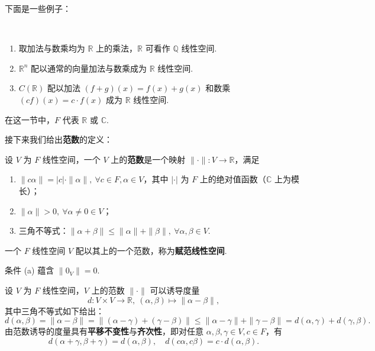 \documentclass[../main.tex]{subfiles}
\begin{document}
下面是一些例子：

\begin{example}[线性空间的例子]
    \ 
    \begin{enumerate}[label = (\alph*)]
        \item 取加法与数乘均为 $\mathbb R$ 上的乘法，$\mathbb R$ 可看作 $\mathbb Q$ 线性空间. 
        \item $\mathbb R^n$ 配以通常的向量加法与数乘成为 $\mathbb R$ 线性空间. 
        \item $C(\mathbb R)$ 配以加法 $(f + g)(x) = f(x) + g(x)$ 和数乘 $(cf)(x) = c \cdot f(x)$ 成为 $\mathbb R$ 线性空间. 
    \end{enumerate}
\end{example}

在这一节中，$F$ 代表 $\mathbb R$ 或 $\mathbb C$. 

接下来我们给出\textbf{范数}的定义：

\begin{definition}[范数的定义]
    设 $V$ 为 $F$ 线性空间，一个 $V$ 上的\textbf{范数}是一个映射 $\|\cdot\|:V \to \mathbb R$，满足
    \begin{enumerate}[label = (\alph*)]
        \item $\|c\alpha\| = |c| \cdot \|\alpha\|,\ \forall c \in F, \alpha \in V$，其中 $|\cdot|$ 为 $F$ 上的绝对值函数（$\mathbb C$ 上为模长）；
        \item $\|\alpha\| > 0,\ \forall \alpha \neq 0 \in V$；
        \item 三角不等式：$\|\alpha + \beta\| \leqslant \|\alpha\| + \|\beta\|,\ \forall \alpha, \beta \in V$. 
    \end{enumerate}
    一个 $F$ 线性空间 $V$ 配以其上的一个范数，称为\textbf{赋范线性空间}. 
\end{definition}

\begin{remark}
    条件 (a) 蕴含 $\|0_V\| = 0$. 
\end{remark}

设 $V$ 为 $F$ 线性空间，$V$ 上的范数 $\|\cdot\|$ 可以诱导度量 
$$
d:V \times V \to \mathbb R,\ (\alpha, \beta) \mapsto \|\alpha - \beta\|, 
$$
其中三角不等式如下给出：
$$
d(\alpha, \beta) = \|\alpha - \beta\| = \|(\alpha - \gamma) + (\gamma - \beta)\| \leqslant \|\alpha - \gamma\| + \|\gamma - \beta\| = d(\alpha, \gamma) + d(\gamma, \beta). 
$$
由范数诱导的度量具有\textbf{平移不变性}与\textbf{齐次性}，即对任意 $\alpha, \beta, \gamma \in V, c \in F$，有
$$
d(\alpha + \gamma, \beta + \gamma) = d(\alpha, \beta),\quad d(c\alpha, c\beta) = c \cdot d(\alpha, \beta). 
$$ 
\end{document}
